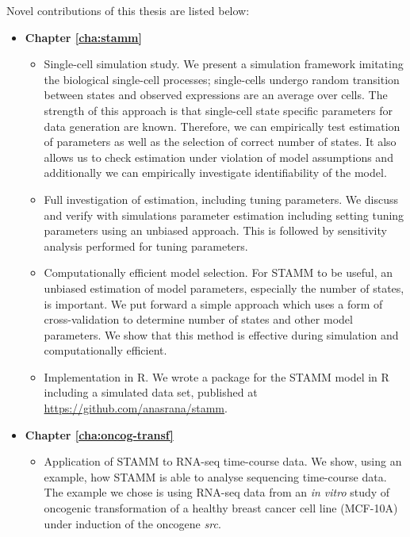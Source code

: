 \vspace*{2cm}
\noindent Novel contributions of this thesis are listed below:
\begin{itemize}
\item {\bf Chapter \ref{cha:stamm}}
\begin{itemize}
\item Single-cell simulation study. We present a simulation framework imitating the biological single-cell processes; single-cells undergo random transition between states and observed expressions are an average over cells. The strength of this approach is that single-cell state specific parameters for data generation are known. Therefore, we can empirically test estimation of parameters as well as the selection of correct number of states. It also allows us to check estimation under violation of model assumptions and additionally we can empirically investigate identifiability of the model.

\item Full investigation of estimation, including tuning parameters. We discuss and verify with simulations parameter estimation including setting tuning parameters using an unbiased approach. This is followed by sensitivity analysis performed for tuning parameters.

\item Computationally efficient model selection. For STAMM to be useful, an unbiased estimation of model parameters, especially the number of states, is important. We put forward a simple approach which uses a form of cross-validation to determine number of states and other model parameters. We show that this method is effective during simulation and computationally efficient.

\item Implementation in R. We wrote a package for the STAMM model in R including a simulated data set, published at \url{https://github.com/anasrana/stamm}.

\end{itemize}

\item {\bf Chapter \ref{cha:oncog-transf}}

\begin{itemize}
\item Application of STAMM to RNA-seq time-course data.
We show, using an example, how STAMM is able to analyse sequencing time-course data. The example we chose is using RNA-seq data from an {\it in vitro} study of oncogenic transformation of a healthy breast cancer cell line (MCF-10A) under induction of the oncogene {\it src}.


\end{itemize}
\end{itemize}
